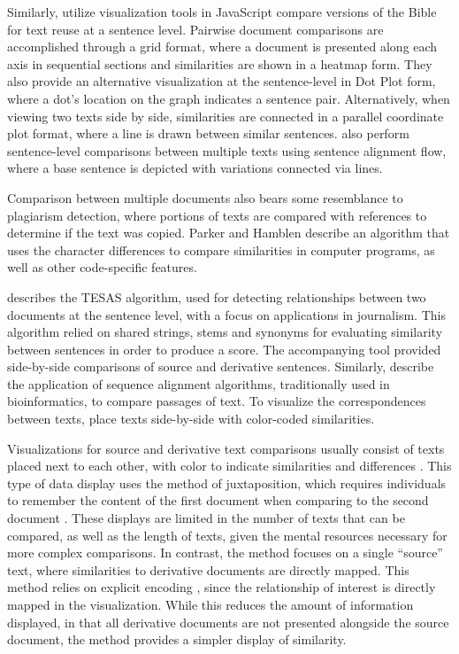 Similarly, \citet{janicke_visualizations_2014} utilize visualization tools in JavaScript compare versions of the Bible for text reuse at a sentence level.
Pairwise document comparisons are accomplished through a grid format, where a document is presented along each axis in sequential sections and similarities are shown in a heatmap form.
They also provide an alternative visualization at the sentence-level in Dot Plot form, where a dot's location on the graph indicates a sentence pair.
Alternatively, when viewing two texts side by side, similarities are connected in a parallel coordinate plot format, where a line is drawn between similar sentences.
\citet{janicke_visualizations_2014} also perform sentence-level comparisons between multiple texts using sentence alignment flow, where a base sentence is depicted with variations connected via lines.

Comparison between multiple documents also bears some resemblance to plagiarism detection, where portions of texts are compared with references to determine if the text was copied.
Parker and Hamblen \citep{parker} describe an algorithm that uses the character differences to compare similarities in computer programs, as well as other code-specific features.

\citet{piao_tool_2003} describes the TESAS algorithm, used for detecting relationships between two documents at the sentence level, with a focus on applications in journalism.
This algorithm relied on shared strings, stems and synonyms for evaluating similarity between sentences in order to produce a score.
The accompanying tool provided side-by-side comparisons of source and derivative sentences.
Similarly, \citet{olsen_something_2011} describe the application of sequence alignment algorithms, traditionally used in bioinformatics, to compare passages of text.
To visualize the correspondences between texts, \citet{olsen_something_2011} place texts side-by-side with color-coded similarities.

Visualizations for source and derivative text comparisons usually consist of texts placed next to each other, with color to indicate similarities and differences \citep{olsen_something_2011, fryTracingOrigin2018, piao_tool_2003}.
This type of data display uses the method of juxtaposition, which requires individuals to remember the content of the first document when comparing to the second document \citep{gleicher_visual_2011}.
These displays are limited in the number of texts that can be compared, as well as the length of texts, given the mental resources necessary for more complex comparisons.
In contrast, the  method focuses on a single ``source'' text, where similarities to derivative documents are directly mapped.
This method relies on explicit encoding \citep{gleicher_visual_2011}, since the relationship of interest is directly mapped in the visualization.
While this reduces the amount of information displayed, in that all derivative documents are not presented alongside the source document, the method provides a simpler display of similarity.

